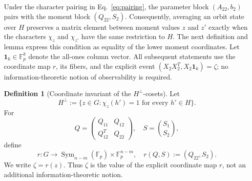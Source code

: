 \documentclass[11pt]{article}
\newcommand{\F}{\mathbb F}
\newcommand{\Sym}{\operatorname{Sym}}
\newcommand{\1}{\mathbf 1}
\theoremstyle{plain}
\theoremstyle{definition}
\newtheorem{definition}[theorem]{Definition}
\theoremstyle{remark}
\begin{document}
Under the character pairing in Eq.~\eqref{eq:pairing}, the parameter block
$(A_{22},b_2)$ pairs with the moment block $(Q_{22},S_2)$.  Consequently,
averaging an orbit state over $H$ preserves a matrix element between moment
values $z$ and $z'$ exactly when the characters $\chi_z$ and $\chi_{z'}$ have
the same restriction to $H$.  The next definition and lemma express this
condition as equality of the lower moment coordinates.  Let $\1_k\in\F_p^k$ denote the all-ones column vector.  All subsequent
statements use the coordinate map $r$, its fibers, and the explicit event
$(X_2X_2^T,X_2\1_k)=\zeta$; no information-theoretic notion of observability
is required.

\begin{definition}[Coordinate invariant of the $H^\perp$-cosets]
Let
\begin{equation}
 H^\perp:=\{z\in G:\chi_z(h')=1\text{ for every }h'\in H\}.
 \label{eq:odd-annihilator-definition}
\end{equation}
For
\begin{equation}
 Q=\begin{pmatrix}Q_{11}&Q_{12}\\Q_{12}^T&Q_{22}\end{pmatrix},
 \quad S=\binom{S_1}{S_2},
 \label{eq:moment-coordinate-split}
\end{equation}
define
\begin{equation}
 r:G\longrightarrow\Sym_{n-m}(\F_p)\times\F_p^{n-m},
 \quad r(Q,S):=(Q_{22},S_2).
 \label{eq:unreported-moment-early}
\end{equation}
We write $\zeta=r(z)$.  Thus $\zeta$ is the value of the explicit coordinate
map $r$, not an additional information-theoretic notion.
\end{definition}
\end{document}
